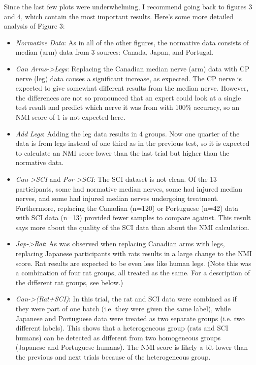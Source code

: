 \documentclass[12pt]{article}
\begin{document}
Since the last few plots were underwhelming, I recommend going back to figures 3 and 4, which contain the most important results. Here's some more detailed analysis of Figure 3:

\begin{itemize}
\item \emph{Normative Data}: As in all of the other figures, the normative data consists of median (arm) data from 3 sources: Canada, Japan, and Portugal.
\item \emph{Can Arms->Legs}: Replacing the Canadian median nerve (arm) data with CP nerve (leg) data causes a significant increase, as expected. The CP nerve is expected to give somewhat different results from the median nerve. However, the differences are not so pronounced that an expert could look at a single test result and predict which nerve it was from with 100\% accuracy, so an NMI score of 1 is not expected here.
\item \emph{Add Legs}: Adding the leg data results in 4 groups. Now one quarter of the data is from legs instead of one third as in the previous test, so it is expected to calculate an NMI score lower than the last trial but higher than the normative data.
\item \emph{Can->SCI} and \emph{Por->SCI}: The SCI dataset is not clean. Of the 13 participants, some had normative median nerves, some had injured median nerves, and some had injured median nerves undergoing treatment. Furthermore, replacing the Canadian (n=120) or Portuguese (n=42) data with SCI data (n=13) provided fewer samples to compare against. This result says more about the quality of the SCI data than about the NMI calculation.
\item \emph{Jap->Rat}: As was observed when replacing Canadian arms with legs, replacing Japanese participants with rats results in a large change to the NMI score. Rat results are expected to be even less like human legs. (Note this was a combination of four rat groups, all treated as the same. For a description of the different rat groups, see below.)
\item \emph{Can->(Rat+SCI)}: In this trial, the rat and SCI data were combined as if they were part of one batch (i.e. they were given the same label), while Japanese and Portuguese data were treated as two separate groups (i.e. two different labels). This shows that a heterogeneous group (rats and SCI humans) can be detected as different from two homogeneous groups (Japanese and Portuguese humans). The NMI score is likely a bit lower than the previous and next trials because of the heterogeneous group.

\end{itemize}
\end{document}
